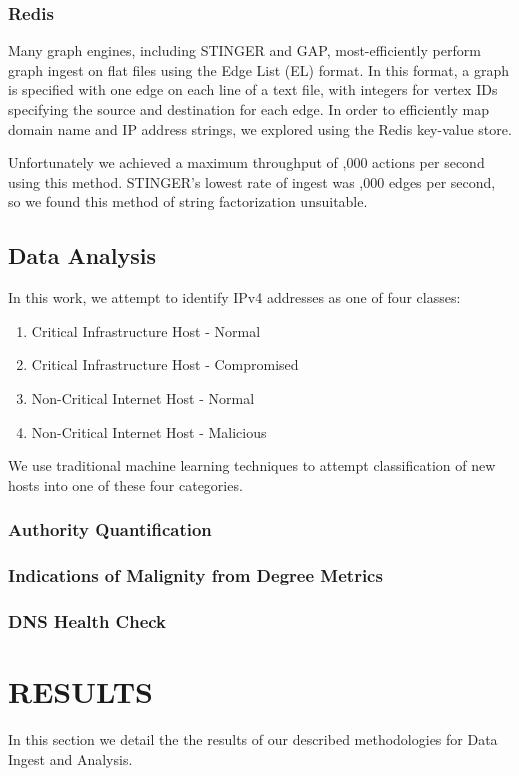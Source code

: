 \documentclass{acm_proc_article-sp}
\begin{document}
\subsubsection{Redis}
Many graph engines, including STINGER and GAP, most-efficiently perform graph ingest on flat files using the Edge List (EL) format. In this format, a graph is specified with one edge on each line of a text file, with integers for vertex IDs specifying the source and destination for each edge. In order to efficiently map domain name and IP address strings, we explored using the Redis key-value store. 

Unfortunately we achieved a maximum throughput of ,000 actions per second using this method. STINGER's lowest rate of ingest was ,000 edges per second, so we found this method of string factorization unsuitable.

\subsection{Data Analysis}
In this work, we attempt to identify IPv4 addresses as one of four classes:
\begin{enumerate}
    \item Critical Infrastructure Host - Normal
    \item Critical Infrastructure Host - Compromised
    \item Non-Critical Internet Host - Normal
    \item Non-Critical Internet Host - Malicious
\end{enumerate}  

We use traditional machine learning techniques to attempt classification of new hosts into one of these four categories.

\subsubsection{Authority Quantification}

\subsubsection{Indications of Malignity from Degree Metrics}

\subsubsection{DNS Health Check}

\section{RESULTS}
In this section we detail the the results of our described methodologies for Data Ingest and Analysis.
\end{document}
